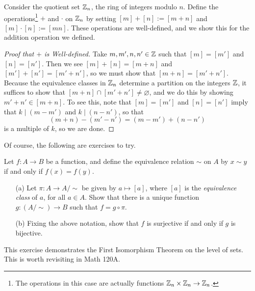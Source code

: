 \documentclass{article}
\begin{document}
\begin{example}
Consider the quotient set $\mathbb Z_n$, the ring of integers modulo $n$. Define the operations\footnote{The operations in this case are actually functions $\mathbb Z_n \times \mathbb Z_n \to \mathbb Z_n$.} $+$ and $\cdot$ on $\mathbb Z_n$ by setting $[m] + [n] := [m+n]$ and $[m] \cdot [n] := [mn]$. These operations are well-defined, and we show this for the addition operation we defined.
\end{example}
\begin{proof}[Proof that $+$ is Well-defined]
Take $m,m', n, n'\in \mathbb Z$ such that $[m] = [m']$ and $[n] = [n']$. Then we see $[m] + [n] = [m+n]$ and $[m'] + [n'] = [m'+n']$, so we must show that $[m+n] = [m'+n']$. Because the equivalence classes in $\mathbb Z_n$ determine a partition on the integers $\mathbb Z$, it suffices to show that $[m+n] \cap [m'+n'] \neq \varnothing$, and we do this by showing $m'+n' \in [m+n]$. To see this, note that $[m] = [m']$ and $[n] = [n']$ imply that $k\mid (m - m')$ and $k \mid (n - n')$, so that
$$(m + n) - (m' - n') = (m-m') + (n - n')$$
is a multiple of $k$, so we are done.
\end{proof}

Of course, the following are exercises to try.
\begin{exercise}
Let $f: A\to B$ be a function, and define the equivalence relation $\sim$ on $A$ by $x\sim y$ if and only if $f(x) = f(y)$.
\begin{itemize}
    \item[(a)] Let $\pi: A\to A/\sim$ be given by $a\mapsto [a]$, where $[a]$ is the \textit{equivalence class} of $a$, for all $a\in A$. Show that there is a unique function $g: (A/\sim) \to B$ such that $f = g\circ \pi$.
    \item[(b)] Fixing the above notation, show that $f$ is surjective if and only if $g$ is bijective.
\end{itemize}
This exercise demonstrates the First Isomorphism Theorem on the level of sets. This is worth revisiting in Math 120A.
\end{exercise}
\end{document}
